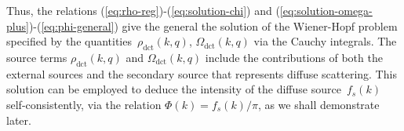 \documentclass[preprint,aps,eqsecnum, prb]{revtex4-1}
\newcommand{\dct}[1]{{#1}_\mathrm{dct}}
\begin{document}
Thus, the relations (\ref{eq:rho-reg})-(\ref{eq:solution-chi})
and (\ref{eq:solution-omega-plus})-(\ref{eq:phi-general})
give the general the solution of the Wiener-Hopf problem specified
by the quantities~$\dct{\rho}(k, q)$, $\dct{\Omega}(k, q)$ via
the Cauchy integrals. The source terms $\dct{\rho}(k, q)$
and $\dct{\Omega}(k, q)$ include the contributions of
both the external sources and the secondary source that represents
diffuse scattering.
This solution can be employed to deduce the intensity
of the diffuse source~$f_s(k)$ self-consistently, via the relation
$\Phi(k) = f_{s}(k)/\pi$, as we shall demonstrate later.
\end{document}
